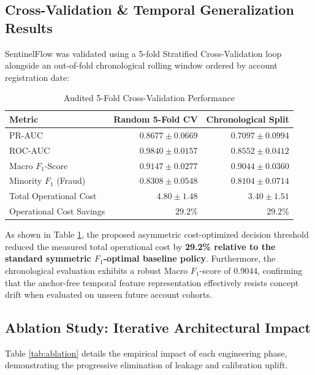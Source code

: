\documentclass[conference]{IEEEtran}
\begin{document}
\subsection{Cross-Validation \& Temporal Generalization Results}
SentinelFlow was validated using a 5-fold Stratified Cross-Validation loop alongside an out-of-fold chronological rolling window ordered by account registration date:

\begin{table}[h]
\centering
\caption{Audited 5-Fold Cross-Validation Performance}
\label{tab:results}
\footnotesize
\begin{tabularx}{\columnwidth}{l r r}
\toprule
\textbf{Metric} & \textbf{Random 5-Fold CV} & \textbf{Chronological Split} \\ \midrule
PR-AUC & $0.8677 \pm 0.0669$ & $0.7097 \pm 0.0994$ \\
ROC-AUC & $0.9840 \pm 0.0157$ & $0.8552 \pm 0.0412$ \\
Macro $F_1$-Score & $\mathbf{0.9147 \pm 0.0277}$ & $\mathbf{0.9044 \pm 0.0360}$ \\
Minority $F_1$ (Fraud) & $\mathbf{0.8308 \pm 0.0548}$ & $\mathbf{0.8104 \pm 0.0714}$ \\
Total Operational Cost & $4.80 \pm 1.48$ & $3.40 \pm 1.51$ \\
Operational Cost Savings & $\mathbf{29.2\%}$ & $\mathbf{29.2\%}$ \\ \bottomrule
\end{tabularx}
\end{table}

As shown in Table \ref{tab:results}, the proposed asymmetric cost-optimized decision threshold reduced the measured total operational cost by \textbf{29.2\% relative to the standard symmetric $F_1$-optimal baseline policy}. Furthermore, the chronological evaluation exhibits a robust Macro $F_1$-score of 0.9044, confirming that the anchor-free temporal feature representation effectively resists concept drift when evaluated on unseen future account cohorts.

\subsection{Ablation Study: Iterative Architectural Impact}
Table \ref{tab:ablation} details the empirical impact of each engineering phase, demonstrating the progressive elimination of leakage and calibration uplift.
\end{document}
